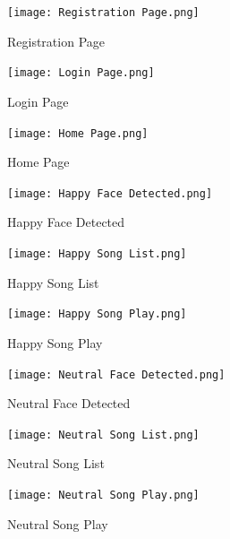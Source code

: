 \documentclass[12pt]{report}
\begin{document}
\vspace{1cm}
\begin{figure}[h]
\centering
\texttt{[image: Registration Page.png]}
\caption{Registration Page
}
\label{Registration Page
}
\end{figure}

\vspace{1.5cm}
\begin{figure}[h]
\centering
\texttt{[image: Login Page.png]}
\caption{Login Page
}
\label{Login Page
}
\end{figure}

\vspace{1cm}
\begin{figure}[h]
\centering
\texttt{[image:   Home Page.png]}
\caption{ Home Page
}
\label{ Home Page}
\end{figure}

\vspace{1.5cm}
\begin{figure}[h]
\centering
\texttt{[image:   Happy Face Detected.png]}
\caption{  Happy Face Detected
}
\label{ Happy Face Detected
}
\end{figure}

\vspace{1cm}
\begin{figure}[h]
\centering
\texttt{[image:  Happy Song List.png]}
\caption{ Happy Song List
}
\label{Happy Song List
}
\end{figure}

\vspace{1.5cm}
\begin{figure}[h]
\centering
\texttt{[image:  Happy Song Play.png]}
\caption{ Happy Song Play}
\label{Happy Song Play
}
\end{figure}

\vspace{1cm}
\begin{figure}[h]
\centering
\texttt{[image:  Neutral Face Detected.png]}
\caption{ Neutral Face Detected
}
\label{Neutral Face Detected}
\end{figure}

\vspace{1.5cm}
\begin{figure}[h]
\centering
\texttt{[image: Neutral Song List.png]}
\caption{Neutral Song List
}
\label{Neutral Song List
}
\end{figure}

\vspace{1cm}
\begin{figure}[h]
\centering
\texttt{[image: Neutral Song Play.png]}
\caption{ Neutral Song Play
}
\label{Neutral Song Play
}
\end{figure}
\end{document}
